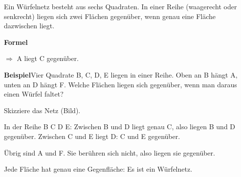 \documentclass[11pt]{article}
\newlength{\kr}
\begin{document}
\noindent Ein Würfelnetz besteht aus sechs Quadraten. In einer Reihe (waagerecht oder senkrecht) liegen sich zwei Flächen gegenüber, wenn genau eine Fläche dazwischen liegt.\par\medskip
\noindent\textbf{Formel}\par\nopagebreak\noindent\hspace*{4mm}\begin{minipage}{\dimexpr\linewidth-4mm\relax} \quad $\Rightarrow$ \quad A liegt C gegenüber.\end{minipage}\par\medskip
\noindent\textbf{Beispiel}\quad Vier Quadrate B, C, D, E liegen in einer Reihe. Oben an B hängt A, unten an D hängt F. Welche Flächen liegen sich gegenüber, wenn man daraus einen Würfel faltet?\par\smallskip
\noindent\begin{minipage}[t]{0.6\linewidth}\vspace{0pt}\par\noindent{}Skizziere das Netz (Bild).\par\smallskip\par\noindent{}In der Reihe B C D E: Zwischen B und D liegt genau C, also liegen B und D gegenüber. Zwischen C und E liegt D: C und E gegenüber.\par\smallskip\par\noindent{}Übrig sind A und F. Sie berühren sich nicht, also liegen sie gegenüber.\par\smallskip\par\noindent{}Jede Fläche hat genau eine Gegenfläche: Es ist ein Würfelnetz.\par\smallskip\end{minipage}\hfill
\begin{minipage}[t]{0.37\linewidth}\vspace{0pt}\centering {}\end{minipage}\par\medskip
\end{document}
